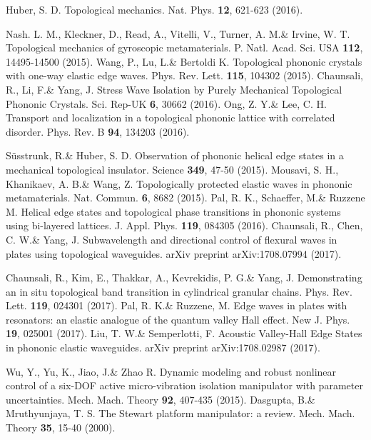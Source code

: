 \documentclass[aps,preprint,onecolumn,showpacs,superscriptaddress,groupedaddress]{revtex4}  %
\begin{document}
\begin{thebibliography}{99}
	Huber, S. D. Topological mechanics. Nat. Phys.  \textbf{12}, 621-623 (2016). 

	Nash. L. M., Kleckner, D., Read, A., Vitelli, V., Turner, A. M.\& Irvine, W. T. Topological mechanics of gyroscopic metamaterials. P. Natl. Acad. Sci. USA \textbf{112}, 14495-14500 (2015).
	Wang, P., Lu, L.\& Bertoldi K. Topological phononic crystals with one-way elastic edge waves. Phys. Rev. Lett.  \textbf{115}, 104302 (2015).
	Chaunsali, R., Li, F.\& Yang, J. Stress Wave Isolation by Purely Mechanical Topological Phononic Crystals. Sci. Rep-UK  \textbf{6}, 30662 (2016).
	Ong, Z. Y.\& Lee, C. H. Transport and localization in a topological phononic lattice with correlated disorder. Phys. Rev. B  \textbf{94}, 134203 (2016).

	Süsstrunk, R.\& Huber, S. D. Observation of phononic helical edge states in a mechanical topological insulator. Science  \textbf{349}, 47-50 (2015). 
	Mousavi, S. H., Khanikaev, A. B.\& Wang, Z. Topologically protected elastic waves in phononic metamaterials. Nat. Commun. \textbf{6}, 8682 (2015).
	Pal, R. K., Schaeffer, M.\& Ruzzene M. Helical edge states and topological phase transitions in phononic systems using bi-layered lattices. J. Appl. Phys. \textbf{119}, 084305 (2016).
	Chaunsali, R., Chen, C. W.\& Yang, J. Subwavelength and directional control of flexural waves in plates using topological waveguides. arXiv preprint arXiv:1708.07994 (2017).


	Chaunsali, R., Kim, E., Thakkar, A., Kevrekidis, P. G.\& Yang, J.  Demonstrating an in situ topological band transition in cylindrical granular chains. Phys. Rev. Lett. \textbf{119}, 024301 (2017).
	Pal, R. K.\& Ruzzene, M. Edge waves in plates with resonators: an elastic analogue of the quantum valley Hall effect. New J. Phys. \textbf{19}, 025001 (2017).
	Liu, T. W.\& Semperlotti, F. Acoustic Valley-Hall Edge States in phononic elastic waveguides. arXiv preprint arXiv:1708.02987  (2017).

	Wu, Y., Yu, K., Jiao, J.\& Zhao R. Dynamic modeling and robust nonlinear control of a six-DOF active micro-vibration isolation manipulator with parameter uncertainties. Mech. Mach. Theory  \textbf{92}, 407-435 (2015).  
	Dasgupta, B.\& Mruthyunjaya, T. S. The Stewart platform manipulator: a review. Mech. Mach. Theory \textbf{35}, 15-40 (2000). 


\end{thebibliography}
\end{document}
